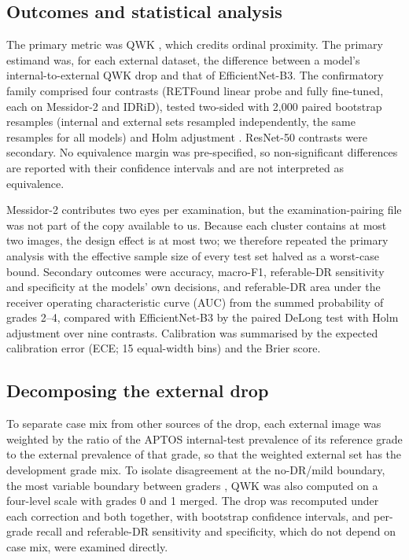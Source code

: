 \documentclass[pdflatex,sn-basic,Numbered]{sn-jnl}
\begin{document}
\subsection{Outcomes and statistical analysis}\label{sec:stats}

The primary metric was QWK \cite{cohen1968kappa}, which credits ordinal proximity. The primary estimand was, for each external dataset, the difference between a model's internal-to-external QWK drop and that of EfficientNet-B3. The confirmatory family comprised four contrasts (RETFound linear probe and fully fine-tuned, each on Messidor-2 and IDRiD), tested two-sided with 2,000 paired bootstrap resamples (internal and external sets resampled independently, the same resamples for all models) \cite{efron1994bootstrap} and Holm adjustment \cite{holm1979}. ResNet-50 contrasts were secondary. No equivalence margin was pre-specified, so non-significant differences are reported with their confidence intervals and are not interpreted as equivalence.

Messidor-2 contributes two eyes per examination, but the examination-pairing file was not part of the copy available to us. Because each cluster contains at most two images, the design effect is at most two; we therefore repeated the primary analysis with the effective sample size of every test set halved as a worst-case bound. Secondary outcomes were accuracy, macro-F1, referable-DR sensitivity and specificity at the models' own decisions, and referable-DR area under the receiver operating characteristic curve (AUC) from the summed probability of grades 2--4, compared with EfficientNet-B3 by the paired DeLong test \cite{delong1988,sun2014fast} with Holm adjustment over nine contrasts. Calibration was summarised by the expected calibration error (ECE; 15 equal-width bins) \cite{guo2017calibration} and the Brier score.

\subsection{Decomposing the external drop}\label{sec:decomp}

To separate case mix from other sources of the drop, each external image was weighted by the ratio of the APTOS internal-test prevalence of its reference grade to the external prevalence of that grade, so that the weighted external set has the development grade mix. To isolate disagreement at the no-DR/mild boundary, the most variable boundary between graders \cite{krause2018}, QWK was also computed on a four-level scale with grades 0 and 1 merged. The drop was recomputed under each correction and both together, with bootstrap confidence intervals, and per-grade recall and referable-DR sensitivity and specificity, which do not depend on case mix, were examined directly.
\end{document}
